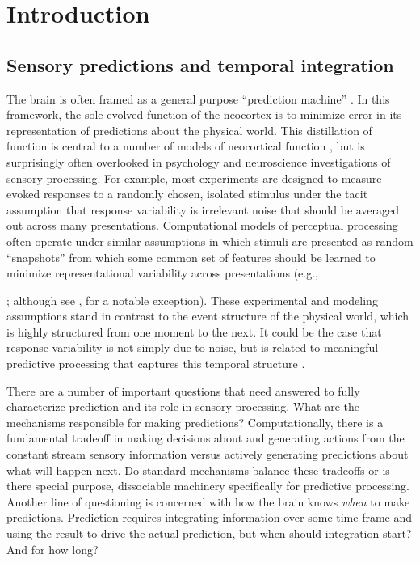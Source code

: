 \documentclass[dwyatte_dissertation.tex]{subfiles}
\begin{document}
\sloppy

\chapter{Introduction}
\label{chap:intro}

\section{Sensory predictions and temporal integration}
The brain is often framed as a general purpose ``prediction machine'' \cite{HawkinsBlakeslee04,Clark13}. In this framework, the sole evolved function of the neocortex is to minimize error in its representation of predictions about the physical world. This distillation of function is central to a number of models of neocortical function \cite[e.g.,]{DayanHintonNealEtAl95,RaoBallard99,LeeMumford03,Friston05,GeorgeHawkins09}, but is surprisingly often overlooked in psychology and neuroscience investigations of sensory processing. For example, most experiments are designed to measure evoked responses to a randomly chosen, isolated stimulus under the tacit assumption that response variability is irrelevant noise that should be averaged out across many presentations. Computational models of perceptual processing often operate under similar assumptions in which stimuli are presented as random ``snapshots'' from which some common set of features should be learned to minimize representational variability across presentations (e.g., {; although see , for a notable exception). These experimental and modeling assumptions stand in contrast to the event structure of the physical world, which is highly structured from one moment to the next. It could be the case that response variability is not simply due to noise, but is related to meaningful predictive processing that captures this temporal structure \cite{ArieliSterkinGrinvaldEtAl96,WilderJonesAhmedEtAl13,FischerWhitney14}.

There are a number of important questions that need answered to fully characterize prediction and its role in sensory processing. What are the mechanisms responsible for making predictions? Computationally, there is a fundamental tradeoff in making decisions about and generating actions from the constant stream sensory information versus actively generating predictions about what will happen next. Do standard mechanisms balance these tradeoffs or is there special purpose, dissociable machinery specifically for predictive processing. Another line of questioning is concerned with how the brain knows \textit{when} to make predictions. Prediction requires integrating information over some time frame and using the result to drive the actual prediction, but when should integration start? And for how long? 

}
\end{document}
